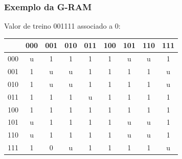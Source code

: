 \documentclass{beamer}
\begin{document}
\begin{frame}
    \frametitle{Exemplo da G-RAM}
    Valor de treino 001111 associado a 0:

    \begin{table}
        \centering
        \begin{tabular}{|c|c|c|c|c|c|c|c|c|}
            \hline
                &       000 &       001 &       010 &       011 &       100 &       101 &       110 &       111\\
            \hline
            000 &        u  &        1  &        1  &        1  &        1  &        u  &        u  &        1 \\
            \hline
            001 &        1  &        u  &        u  &        1  &        1  &        1  &        1  &        u \\
            \hline
            010 &        1  &        u  &        u  &        1  &        1  &        1  &        1  &        u \\
            \hline
            011 &        1  &        1  &        1  &        u  &        1  &        1  &        1  &        1 \\
            \hline
            100 &        1  &        1  &        1  &        1  &        1  &        1  &        1  &        1 \\
            \hline
            101 &        u  &        1  &        1  &        1  &        1  &        u  &        u  &        1 \\
            \hline
            110 &        u  &        1  &        1  &        1  &        1  &        u  &        u  &        1 \\
            \hline
            111 &        1  & \alert 0  &        u  &        1  &        1  &        1  &        1  &        u \\
            \hline

        \end{tabular}
    \end{table}
\end{frame}
\end{document}
